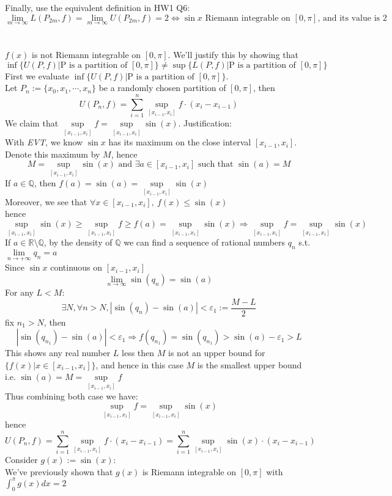 \documentclass{article}
\def\R{\mathbb{R}}
\def\Q{\mathbb{Q}}
\def\iff{\Longleftrightarrow}
\def\to{\rightarrow}
\def\imply{\Longrightarrow}
\def\oo{\infty}
\begin{document}
Finally, use the equivalent definition in HW1 Q6:
$$\lim_{m\to\infty} L(P_{2m}, f) = \lim_{m\to\infty} U(P_{2m}, f) = 2 \iff \sin x \text{ Riemann integrable on } [0,\pi] \text{, and its value is } 2$$

\section{} %
\def\upd{U(P, f)}
\def\lowd{L(P, f)}
\def\updn{U(P_n,f)}
\def\supf{\sup\limits_{[x_{i-1}, x_i]}f}
\def\supsin{\sup\limits_{[x_{i-1}, x_i]}\sin(x)}
\def\inff{\inf\limits_{[x_{i-1}, x_{i}]}f}
\def\infsin{\inf\limits_{[x_{i-1}, x_i]}\sin(x)}
\def\supg{\sup\limits_{[x_{i-1}, x_i]}g}
$f(x)$ is not Riemann integrable on $[0, \pi]$. We'll justify this by showing that $$\inf\{\upd|\text{P is a partition of $[0, \pi]$}\}\neq \sup\{\lowd|\text{P is a partition of $[0,\pi]$}\}$$
First we evaluate $\inf\{\upd|\text{P is a partition of $[0, \pi]$}\}$.
\\Let $P_n:=\{x_0, x_1,\cdots,x_n\}$ be a randomly chosen partition of $[0, \pi]$, then
$$\updn=\sum_{i=1}^{n}\supf\cdot (x_{i}-x_{i-1})$$
We claim that $\supf=\supsin$. Justification:
\\With \textit{EVT}, we know $\sin x$ has its maximum on the close interval $[x_{i-1}, x_{i}]$. Denote this maximum by $M$, hence $$M=\supsin \text{ and } \exists a\in [x_{i-1}, x_{i}] \text{ such that } \sin(a)=M$$
If $a\in \Q$, then $f(a)=\sin (a) =\supsin$
\\Moreover, we see that $\forall x\in [x_{i-1}, x_i],~f(x)\le \sin(x)$
\\hence $$\supsin\ge\supf\ge f(a)=\supsin\imply \supf=\supsin$$
If $a\in \R\setminus \Q$, by the density of $\Q$ we can find a sequence of rational numbers ${q_n}$ s.t. $\lim\limits_{n\to +\oo}q_n=a$
\\Since $\sin x$ continuous on $[x_{i-1}, x_i]$
$$\lim\limits_{n\to \infty}\sin(q_n)=\sin(a)$$
For any $L<M$:
$$\exists N, \forall n>N, |\sin(q_n)-\sin(a)|<\varepsilon_1:=\frac{M-L}{2}$$
fix $n_1>N$, then $$|\sin(q_{n_1})-\sin(a)|<\varepsilon_1\imply f(q_{n_1})=\sin(q_{n_1})>\sin(a)-\varepsilon_1>L$$
This shows any real number $L$ less then $M$ is not an upper bound for $\{f(x)|x\in [x_{i-1}, x_i]\}$, and hence in this case $M$ is the smallest upper bound i.e. $\sin (a)=M=\supf$
\\Thus combining both case we have:
$$\supf=\supsin$$
hence $$\updn=\sum_{i=1}^{n}\supf\cdot (x_{i}-x_{i-1})=\sum_{i=1}^{n}\supsin\cdot (x_i-x_{i-1})$$
Consider $g(x):=\sin(x)$:
\\We've previously shown that $g(x)$ is Riemann integrable on $[0, \pi]$ with $\int_{0}^{\pi}g(x)dx=2$
\end{document}
